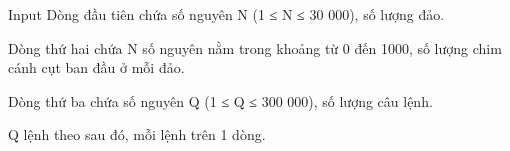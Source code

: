 Input
Dòng đầu tiên chứa số nguyên N (1 ≤ N ≤ 30 000), số lượng đảo.  

   Dòng thứ hai chứa N số nguyên nằm trong khoảng từ 0 đến 1000, số lượng chim cánh cụt ban đầu ở mỗi đảo.  

   Dòng thứ ba chứa số nguyên Q (1 ≤ Q ≤ 300 000), số lượng câu lệnh.  

   Q lệnh theo sau đó, mỗi lệnh trên 1 dòng.